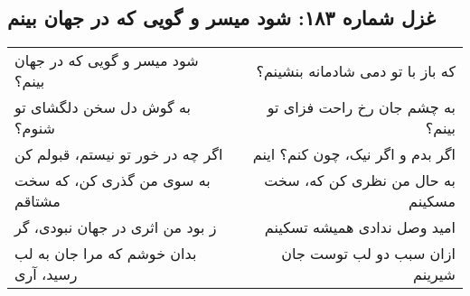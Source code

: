 \begin{center}
\section*{غزل شماره ۱۸۳: شود میسر و گویی که در جهان بینم}
\label{sec:183}
\begin{longtable}{l p{0.5cm} r}
شود میسر و گویی که در جهان بینم؟
&&
که باز با تو دمی شادمانه بنشینم؟
\\
به گوش دل سخن دلگشای تو شنوم؟
&&
به چشم جان رخ راحت فزای تو بینم؟
\\
اگر چه در خور تو نیستم، قبولم کن
&&
اگر بدم و اگر نیک، چون کنم؟ اینم
\\
به سوی من گذری کن، که سخت مشتاقم
&&
به حال من نظری کن که، سخت مسکینم
\\
ز بود من اثری در جهان نبودی، گر
&&
امید وصل ندادی همیشه تسکینم
\\
بدان خوشم که مرا جان به لب رسید، آری
&&
ازان سبب دو لب توست جان شیرینم
\\
\end{longtable}
\end{center}
